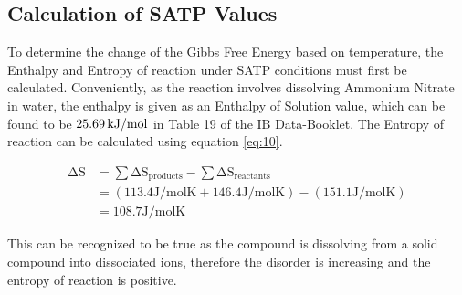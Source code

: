 \documentclass{article}
\begin{document}
\subsection{Calculation of SATP Values}
To determine the change of the Gibbs Free Energy based on temperature, the Enthalpy and Entropy of reaction under SATP conditions must first be calculated. Conveniently, as the reaction involves dissolving Ammonium Nitrate in water, the enthalpy is given as an Enthalpy of Solution value, which can be found to be $\ce{25.69 kJ/mol}$ in Table 19 of the IB Data-Booklet. The Entropy of reaction can be calculated using equation \ref{eq:10}.
\begin{tcolorbox}[title=Calculation of Entropy of Reaction under SATP Conditions]
\begin{equation}
    \begin{split}
        \mathrm{\Delta S} &= \sum{\mathrm{\Delta S_{products}}} - \sum{\mathrm{\Delta S_{reactants}}} \\
        &= \mathrm{(113.4 J/mol K + 146.4 J/mol K) - (151.1 J/mol K)} \\
        &= \mathrm{108.7 J/mol K}
    \end{split}
\end{equation}
\end{tcolorbox}
\noindent
This can be recognized to be true as the compound is dissolving from a solid compound into dissociated ions, therefore the disorder is increasing and the entropy of reaction is positive.
\end{document}
